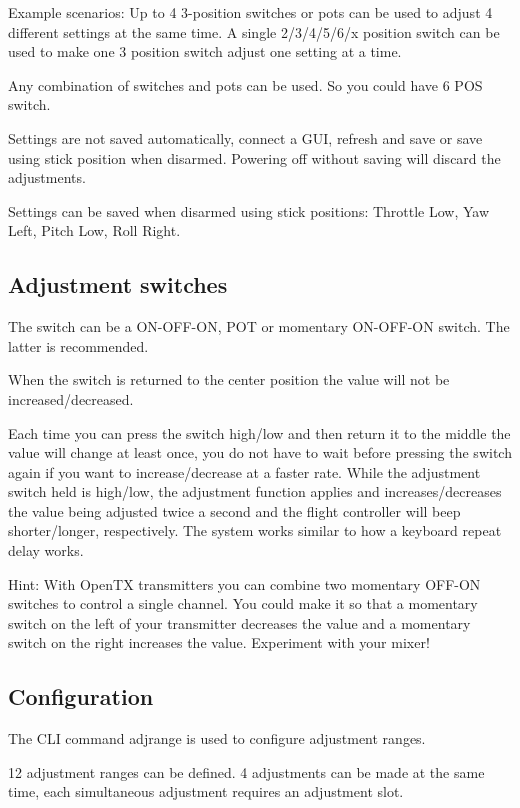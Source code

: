 Example scenarios\+: Up to 4 3-\/position switches or pots can be used to adjust 4 different settings at the same time. A single 2/3/4/5/6/x position switch can be used to make one 3 position switch adjust one setting at a time.

Any combination of switches and pots can be used. So you could have 6 P\+O\+S switch.

Settings are not saved automatically, connect a G\+U\+I, refresh and save or save using stick position when disarmed. Powering off without saving will discard the adjustments.

Settings can be saved when disarmed using stick positions\+: Throttle Low, Yaw Left, Pitch Low, Roll Right.

\subsection*{Adjustment switches}

The switch can be a O\+N-\/\+O\+F\+F-\/\+O\+N, P\+O\+T or momentary O\+N-\/\+O\+F\+F-\/\+O\+N switch. The latter is recommended.

When the switch is returned to the center position the value will not be increased/decreased.

Each time you can press the switch high/low and then return it to the middle the value will change at least once, you do not have to wait before pressing the switch again if you want to increase/decrease at a faster rate. While the adjustment switch held is high/low, the adjustment function applies and increases/decreases the value being adjusted twice a second and the flight controller will beep shorter/longer, respectively. The system works similar to how a keyboard repeat delay works.

Hint\+: With Open\+T\+X transmitters you can combine two momentary O\+F\+F-\/\+O\+N switches to control a single channel. You could make it so that a momentary switch on the left of your transmitter decreases the value and a momentary switch on the right increases the value. Experiment with your mixer!

\subsection*{Configuration}

The C\+L\+I command {\ttfamily adjrange} is used to configure adjustment ranges.

12 adjustment ranges can be defined. 4 adjustments can be made at the same time, each simultaneous adjustment requires an adjustment slot.

